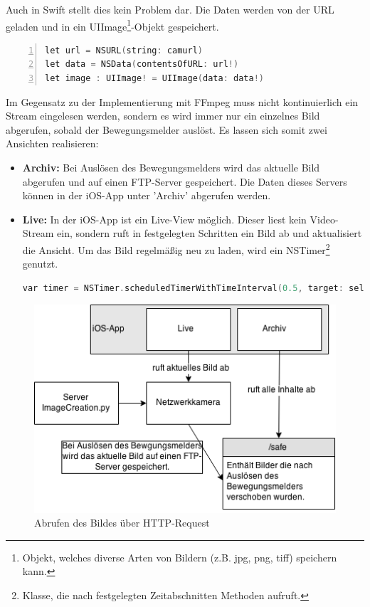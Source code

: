 Auch in Swift stellt dies kein Problem dar. Die Daten werden von der URL geladen und in ein UIImage\footnote{Objekt, welches diverse Arten von Bildern (z.B. jpg, png, tiff) speichern kann.}-Objekt gespeichert. 
\begin{lstlisting}[caption = Abrufen eines BIldes von einer URL in Swift, language=c++, frame=single, breaklines=true,columns=fullflexible, commentstyle=\color{gray}\upshape, captionpos=b, numbers = left]
let url = NSURL(string: camurl)
let data = NSData(contentsOfURL: url!)
let image : UIImage! = UIImage(data: data!)
\end{lstlisting}
Im Gegensatz zu der Implementierung mit FFmpeg muss nicht kontinuierlich ein Stream eingelesen werden, sondern es wird immer nur ein einzelnes Bild abgerufen, sobald der Bewegungsmelder auslöst. Es lassen sich somit zwei Ansichten realisieren:
\begin{itemize}
	\item \textbf{Archiv:} Bei Auslösen des Bewegungsmelders wird das aktuelle Bild abgerufen und auf einen FTP-Server gespeichert. Die Daten dieses Servers können in der iOS-App unter 'Archiv' abgerufen werden. 
	\item \textbf{Live:} In der iOS-App ist ein Live-View möglich. Dieser liest kein Video-Stream ein, sondern ruft in festgelegten Schritten ein Bild ab und aktualisiert die Ansicht. Um das Bild regelmäßig neu zu laden, wird ein NSTimer\footnote{Klasse, die nach festgelegten Zeitabschnitten Methoden aufruft.} genutzt. 
	\begin{lstlisting}[caption = NSTimer in Swift, language=c++, frame=single, breaklines=true,columns=fullflexible, commentstyle=\color{gray}\upshape, captionpos=b]
var timer = NSTimer.scheduledTimerWithTimeInterval(0.5, target: self, selector: Selector("loadImageView"), userInfo: nil, repeats: true)
	\end{lstlisting}
\end{itemize}
\pagebreak
\begin{figure}[h]
	\begin{minipage}{0.9\textwidth}
		\centering
		\includegraphics[width=\textwidth]{./data/httprequest.png}
		\caption{Abrufen des Bildes über HTTP-Request}
	\end{minipage}
\end{figure}

